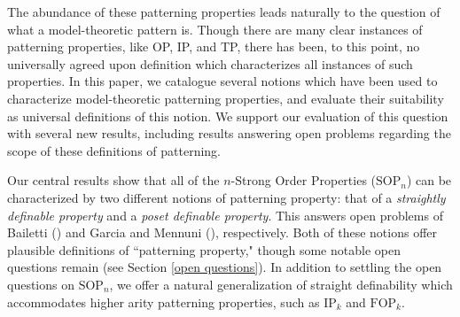 \documentclass{article}
\newcommand{\SOPn}{$\text{SOP}_n$}
\theoremstyle{definition}
\theoremstyle{definition}
\theoremstyle{definition}
\begin{document}
The abundance of these patterning properties leads naturally to the question of what a model-theoretic pattern is. Though there are many clear instances of patterning properties, like OP, IP, and TP, there has been, to this point, no universally agreed upon definition which characterizes all instances of such properties. In this paper, we catalogue several notions which have been used to characterize model-theoretic patterning properties, and evaluate their suitability as universal definitions of this notion. We support our evaluation of this question with several new results, including results answering open problems regarding the scope of these definitions of patterning.

Our central results show that all of the $n$-Strong Order Properties (\SOPn) can be characterized by two different notions of patterning property: that of a \textit{straightly definable property} and a \textit{poset definable property}. This answers open problems of Bailetti (\cite{bailetti2024walk}) and Garcia and Mennuni (\cite{garcia2022model}), respectively. Both of these notions offer plausible definitions of ``patterning property," though some notable open questions remain (see Section \ref{open questions}). 
In addition to settling the open questions on \SOPn, we offer a natural generalization of straight definability which accommodates higher arity patterning properties, such as $\text{IP}_k$ and $\text{FOP}_k$.
\end{document}
